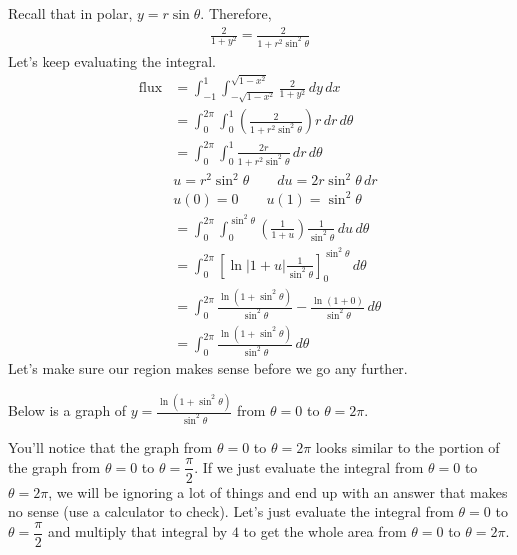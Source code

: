 \documentclass{article}
\newcommand{\lrp}[1]{\left( #1 \right)}
\newcommand{\lrb}[1]{\left[ #1 \right]}
\begin{document}
Recall that in polar, $y=r\sin \theta$. Therefore,
\begin{align*}
    \frac{2}{1+y^2}=\frac{2}{1+r^2\sin^2\theta}
\end{align*}
Let's keep evaluating the integral.
\begin{align*}
    \text{flux}&=\int_{-1}^1\int_{-\sqrt{1-x^2}}^{\sqrt{1-x^2}}\frac{2}{1+y^2}\,dy\,dx\\
    &=\int_0^{2\pi}\int_0^1 \lrp{\frac{2}{1+r^2\sin^2\theta}}r\,dr\,d\theta\\
    &=\int_0^{2\pi}\int_0^1 \frac{2r}{1+r^2\sin^2\theta}\,dr\,d\theta\\
    &u=r^2\sin^2\theta\hspace{2em}du=2r\sin^2\theta\,dr\\
    &u(0)=0\hspace{2em}u(1)=\sin^2\theta\\
    &=\int_0^{2\pi}\int_0^{\sin^2\theta}\lrp{\frac{1}{1+u}}\frac{1}{\sin^2\theta}\,du\,d\theta\\
    &=\int_0^{2\pi}\lrb{\ln \left|1+u\right|\frac{1}{\sin^2\theta}}_0^{\sin^2\theta}\,d\theta\tag{$\theta$ is just a constant}\\
    &=\int_0^{2\pi}\frac{\ln (1+\sin^2\theta)}{\sin^2\theta}-\frac{\ln (1+0)}{\sin^2\theta}\,d\theta\tag{ok to drop abs since $\sin^2 \theta\geq0$}\\
    &=\int_0^{2\pi}\frac{\ln(1+\sin^2\theta)}{\sin^2\theta}\,d\theta\tag{$\ln(1)=0$}
\end{align*}
Let's make sure our region makes sense before we go any further.

Below is a graph of $\displaystyle y=\frac{\ln (1+\sin^2 \theta)}{\sin^2 \theta}$ from $\theta=0$ to $\theta=2\pi$.
\begin{center}
\end{center}
You'll notice that the graph from $\theta=0$ to $\theta=2\pi$ looks similar to the portion of the graph from $\theta=0$ to $\theta=\dfrac{\pi}{2}$. If we just evaluate the integral from $\theta=0$ to $\theta=2\pi$, we will be ignoring a lot of things and end up with an answer that makes no sense (use a calculator to check). Let's just evaluate the integral from $\theta=0$ to $\theta=\dfrac{\pi}{2}$ and multiply that integral by $4$ to get the whole area from $\theta=0$ to $\theta=2\pi$.
\end{document}
